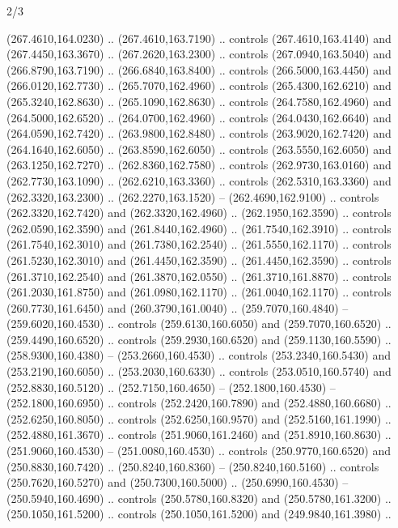 \begin{flagdescription}{2/3}
\begin{scope}[xshift=0.5\flaglength,yshift=0.5\flagwidth,scale=\flagwidth/259.2]
\begin{scope}[y=0.8pt, x=0.8pt, yscale=-1,shift={(-243,-162)}]
      (267.4610,164.0230) .. (267.4610,163.7190) .. controls (267.4610,163.4140) and
      (267.4450,163.3670) .. (267.2620,163.2300) .. controls (267.0940,163.5040) and
      (266.8790,163.7190) .. (266.6840,163.8400) .. controls (266.5000,163.4450) and
      (266.0120,162.7730) .. (265.7070,162.4960) .. controls (265.4300,162.6210) and
      (265.3240,162.8630) .. (265.1090,162.8630) .. controls (264.7580,162.4960) and
      (264.5000,162.6520) .. (264.0700,162.4960) .. controls (264.0430,162.6640) and
      (264.0590,162.7420) .. (263.9800,162.8480) .. controls (263.9020,162.7420) and
      (264.1640,162.6050) .. (263.8590,162.6050) .. controls (263.5550,162.6050) and
      (263.1250,162.7270) .. (262.8360,162.7580) .. controls (262.9730,163.0160) and
      (262.7730,163.1090) .. (262.6210,163.3360) .. controls (262.5310,163.3360) and
      (262.3320,163.2300) .. (262.2270,163.1520) -- (262.4690,162.9100) .. controls
      (262.3320,162.7420) and (262.3320,162.4960) .. (262.1950,162.3590) .. controls
      (262.0590,162.3590) and (261.8440,162.4960) .. (261.7540,162.3910) .. controls
      (261.7540,162.3010) and (261.7380,162.2540) .. (261.5550,162.1170) .. controls
      (261.5230,162.3010) and (261.4450,162.3590) .. (261.4450,162.3590) .. controls
      (261.3710,162.2540) and (261.3870,162.0550) .. (261.3710,161.8870) .. controls
      (261.2030,161.8750) and (261.0980,162.1170) .. (261.0040,162.1170) .. controls
      (260.7730,161.6450) and (260.3790,161.0040) .. (259.7070,160.4840) --
      (259.6020,160.4530) .. controls (259.6130,160.6050) and (259.7070,160.6520) ..
      (259.4490,160.6520) .. controls (259.2930,160.6520) and (259.1130,160.5590) ..
      (258.9300,160.4380) -- (253.2660,160.4530) .. controls (253.2340,160.5430) and
      (253.2190,160.6050) .. (253.2030,160.6330) .. controls (253.0510,160.5740) and
      (252.8830,160.5120) .. (252.7150,160.4650) -- (252.1800,160.4530) --
      (252.1800,160.6950) .. controls (252.2420,160.7890) and (252.4880,160.6680) ..
      (252.6250,160.8050) .. controls (252.6250,160.9570) and (252.5160,161.1990) ..
      (252.4880,161.3670) .. controls (251.9060,161.2460) and (251.8910,160.8630) ..
      (251.9060,160.4530) -- (251.0080,160.4530) .. controls (250.9770,160.6520) and
      (250.8830,160.7420) .. (250.8240,160.8360) -- (250.8240,160.5160) .. controls
      (250.7620,160.5270) and (250.7300,160.5000) .. (250.6990,160.4530) --
      (250.5940,160.4690) .. controls (250.5780,160.8320) and (250.5780,161.3200) ..
      (250.1050,161.5200) .. controls (250.1050,161.5200) and (249.9840,161.3980) ..

\end{scope}
\end{scope}
\end{flagdescription}
